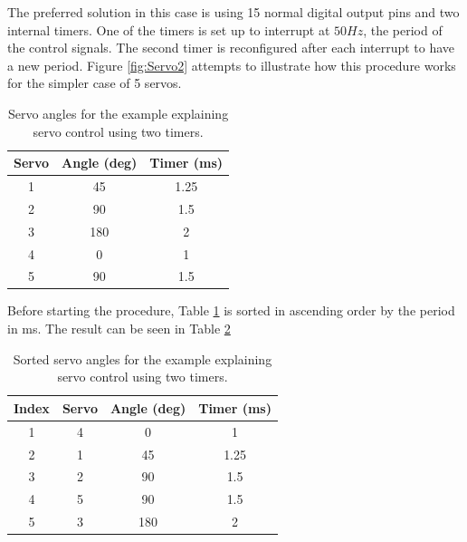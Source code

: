 The preferred solution in this case is using 15 normal digital output pins and two internal timers. One of the timers is set up to interrupt at $50Hz$, the period of the control signals. The second timer is reconfigured after each interrupt to have a new period. Figure \ref{fig:Servo2} attempts to illustrate how this procedure works for the simpler case of 5 servos.\\

\begin{table}[H]
\centering
\caption{Servo angles for the example explaining servo control using two timers.}
\label{tab:servo}
\begin{tabular}{ccc}
\textbf{Servo} & \multicolumn{1}{l}{\textbf{Angle (deg)}} & \multicolumn{1}{l}{\textbf{Timer (ms)}} \\ \hline
1              & 45                                       & 1.25                                \\
2              & 90                                      & 1.5                                    \\
3              & 180                                      & 2                                       \\
4              & 0                                        & 1                                       \\
5              & 90                                      & 1.5                                    
\end{tabular}
\end{table}

Before starting the procedure, Table \ref{tab:servo} is sorted in ascending order by the period in ms. The result can be seen in Table \ref{tab:servo2}

\begin{table}[H]
\centering
\caption{Sorted servo angles for the example explaining servo control using two timers.}
\label{tab:servo2}
\begin{tabular}{cccc}
\textbf{Index} & \textbf{Servo} & \textbf{Angle (deg)} & \textbf{Timer (ms)} \\ \hline
1              & 4              & 0                    & 1                   \\
2              & 1              & 45                   & 1.25                \\
3              & 2              & 90                   & 1.5                 \\
4              & 5              & 90                   & 1.5                 \\
5              & 3              & 180                  & 2                  
\end{tabular}
\end{table}

